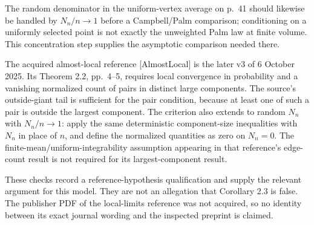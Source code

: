 \documentclass[10pt]{article}
\begin{document}
The random denominator in the uniform-vertex average on p. 41 should likewise be handled by \(N_n/n\to1\) before a Campbell/Palm comparison; conditioning on a uniformly selected point is not exactly the unweighted Palm law at finite volume. This concentration step supplies the asymptotic comparison needed there.\par
The acquired almost-local reference [AlmostLocal] is the later v3 of 6 October 2025. Its Theorem 2.2, pp. 4–5, requires local convergence in probability and a vanishing normalized count of pairs in distinct large components. The source’s outside-giant tail is sufficient for the pair condition, because at least one of such a pair is outside the largest component. The criterion also extends to random \(N_n\) with \(N_n/n\to1\): apply the same deterministic component-size inequalities with \(N_n\) in place of \(n\), and define the normalized quantities as zero on \(N_n=0\). The finite-mean/uniform-integrability assumption appearing in that reference’s edge-count result is not required for its largest-component result.\par
These checks record a reference-hypothesis qualification and supply the relevant argument for this model. They are not an allegation that Corollary 2.3 is false. The publisher PDF of the local-limits reference was not acquired, so no identity between its exact journal wording and the inspected preprint is claimed.\par
\end{document}
